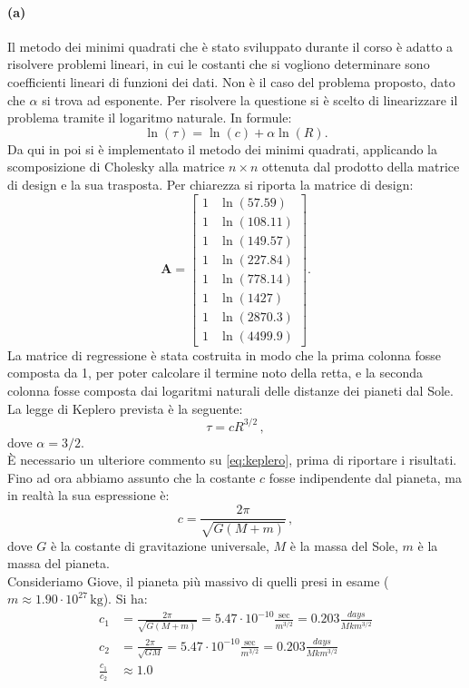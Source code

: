 \documentclass[letterpaper, 12pt]{article}
\begin{document}
\paragraph{(a) } Il metodo dei minimi quadrati che è stato sviluppato durante il corso è adatto a risolvere
problemi lineari, in cui le costanti che si vogliono determinare sono coefficienti lineari di funzioni dei dati.
Non è il caso del problema proposto, dato che $\alpha$ si trova ad esponente. Per risolvere la questione si 
è scelto di linearizzare il problema tramite il logaritmo naturale. In formule:
\begin{equation}
    \ln(\tau) = \ln(c) + \alpha \ln(R).
\end{equation}
Da qui in poi si è implementato il metodo dei minimi quadrati, applicando la scomposizione di Cholesky alla 
matrice $n \times n$ ottenuta dal prodotto della matrice di design e la sua trasposta. Per chiarezza si riporta
la matrice di design:
\begin{equation}
    \mathbf{A} = \begin{bmatrix}
        1 & \ln(57.59) \\
        1 & \ln(108.11) \\
        1 & \ln(149.57) \\
        1 & \ln(227.84) \\
        1 & \ln(778.14) \\
        1 & \ln(1427) \\
        1 & \ln(2870.3) \\
        1 & \ln(4499.9)
    \end{bmatrix}.
\end{equation}
La matrice di regressione è stata costruita in modo che la prima colonna fosse composta da 1, per poter calcolare
il termine noto della retta, e la seconda colonna fosse composta dai logaritmi naturali delle
distanze dei pianeti dal Sole. \\
La legge di Keplero prevista è la seguente:
\begin{equation}
    \label{eq:keplero}
    \tau = c R^{3/2}\,,
\end{equation}
dove $\alpha = 3/2$. \\
È necessario un ulteriore commento su \ref{eq:keplero}, prima di riportare i risultati. Fino ad ora abbiamo
assunto che la costante $c$ fosse indipendente dal pianeta, ma in realtà la sua espressione è:
\begin{equation}
    c = \frac{2\pi}{\sqrt{G (M+m)}}\,,
\end{equation}
dove $G$ è la costante di gravitazione universale, $M$ è la massa del Sole, $m$ è la massa del pianeta. \\
Consideriamo Giove, il pianeta più massivo di quelli presi in esame ($m \approx 1.90 \cdot 10^{27} \, \text{kg}$). Si ha:
\begin{align}
    c_1 &= \frac{2\pi}{\sqrt{G (M+m)}} = 5.47 \cdot 10^{-10} \frac{\text{sec}}{m^{3/2}} = 0.203 \frac{days}{Mkm^{3/2}}  \\
    c_2 &= \frac{2\pi}{\sqrt{G M}}   = 5.47 \cdot 10^{-10} \frac{\text{sec}}{m^{3/2}} = 0.203 \frac{days}{Mkm^{3/2}}    \\
    \frac{c_1}{c_2} &\approx 1.0
\end{align}
\end{document}
